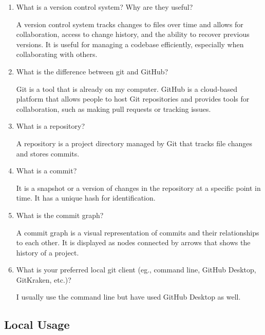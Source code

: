 \documentclass[10pt,twocolumn]{article}
\begin{document}
\begin{enumerate}
    \item What is a version control system? Why are they useful?
    
      A version control system tracks changes to files over time and allows for collaboration, access to change history, and the ability to recover previous versions. It is useful for managing a codebase efficiently, especially when collaborating with others.
    \item What is the difference between git and GitHub?
    
    Git is a tool that is already on my computer. GitHub is a cloud-based platform that allows people to host Git repositories and provides tools for collaboration, such as making pull requests or tracking issues.
    \item What is a repository?
    
    A repository is a project directory managed by Git that tracks file changes and stores commits.
    \item What is a commit?
    
    It is a snapshot or a version of changes in the repository at a specific point in time. It has a unique hash for identification.
    \item What is the commit graph?
    
    A commit graph is a visual representation of commits and their relationships to each other. It is displayed as nodes connected by arrows that shows the history of a project.
    \item What is your preferred local git client (eg., command line, GitHub Desktop, GitKraken, etc.)?
    
    I usually use the command line but have used GitHub Desktop as well.
\end{enumerate}

\subsection{Local Usage}
\end{document}
